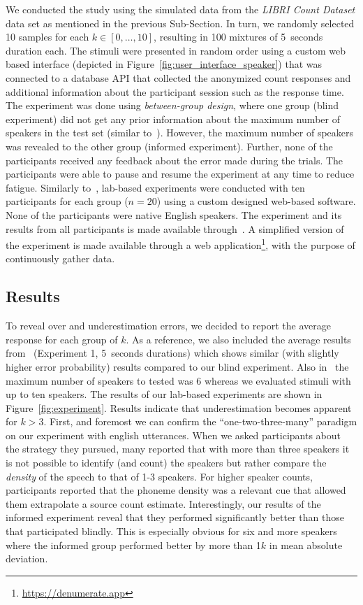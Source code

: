 We conducted the study using the simulated data from the \emph{LIBRI Count Dataset} data set as mentioned in the previous Sub-Section.
In turn, we randomly selected 10 samples for each \(k \in [0, \ldots, 10]\), resulting in 100 mixtures of 5~seconds duration each. 
The stimuli were presented in random order using a custom web based interface (depicted in Figure~\ref{fig:user_interface_speaker}) that was connected to a database API that collected the anonymized count responses and additional information about the participant session such as the response time.
The experiment was done using \emph{between-group design}, where one group (blind experiment) did not get any prior information about the maximum number of speakers in the test set (similar to~\cite{kawashima15}).
However, the maximum number of speakers was revealed to the other group (informed experiment).
Further, none of the participants received any feedback about the error made during the trials.
The participants were able to pause and resume the experiment at any time to reduce fatigue.
Similarly to~\cite{kawashima15}, lab-based experiments were conducted with ten participants for each group (\(n=20\)) using a custom designed web-based software. 
None of the participants were native English speakers.
The experiment and its results from all participants is made available through~\cite{oss_countit}.
A simplified version of the experiment is made available through a web application\footnote{\url{https://denumerate.app}}, with the purpose of continuously gather data.

\subsection{Results}
To reveal over and underestimation errors, we decided to report the average response for each group of \(k\).
As a reference, we also included the average results from~\cite{kawashima15} (Experiment 1, 5~seconds durations) which shows similar (with slightly higher error probability) results compared to our blind experiment.
Also in~\cite{kawashima15} the maximum number of speakers to tested was 6 whereas we evaluated stimuli with up to ten speakers.
The results of our lab-based experiments are shown in Figure~\ref{fig:experiment}.
Results indicate that underestimation becomes apparent for \(k > 3\).
First, and foremost we can confirm the ``one-two-three-many'' paradigm on our experiment with english utterances.
When we asked participants about the strategy they pursued, many reported that with more than three speakers it is not possible to identify (and count) the speakers but rather compare the \emph{density} of the speech to that of 1-3 speakers.
For higher speaker counts, participants reported that the phoneme density was a relevant cue that allowed them extrapolate a source count estimate.
Interestingly, our results of the informed experiment reveal that they performed significantly better than those that participated blindly.
This is especially obvious for six and more speakers where the informed group performed better by more than 1\(k\) in mean absolute deviation.

